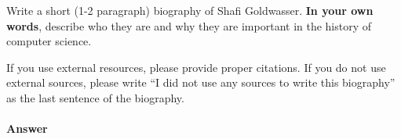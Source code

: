 \documentclass{article}
\begin{document}
\collab{\todo{}}

Write a short (1-2 paragraph) biography of Shafi Goldwasser.
\textbf{In your own words}, describe who they are and why they are important in
the history of computer science.

If you use external resources, please provide
proper citations. If you do not use external sources, please write ``I did not
use any sources to write this biography'' as the last sentence of the
biography.

\paragraph{Answer}


% 
% 
\end{document}
